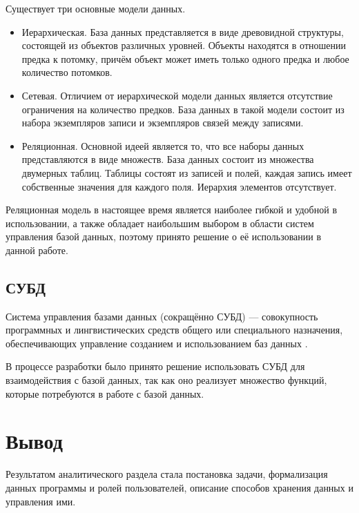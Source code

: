 Существует три основные модели данных.
\begin{itemize}
	\item Иерархическая. База данных представляется в виде древовидной структуры, состоящей из объектов различных уровней. Объекты находятся в отношении предка к потомку, причём объект может иметь только одного предка и любое количество потомков.
	\item Сетевая. Отличием от иерархической модели данных является отсутствие ограничения на количество предков. База данных в такой модели состоит из набора экземпляров записи и экземпляров связей между записями.
	\item Реляционная. Основной идеей является то, что все наборы данных представляются в виде множеств. База данных состоит из множества двумерных таблиц. Таблицы состоят из записей и полей, каждая запись имеет собственные значения для каждого поля. Иерархия элементов отсутствует. 
\end{itemize}

Реляционная модель в настоящее время является наиболее гибкой и удобной в использовании, а также обладает наибольшим выбором в области систем управления базой данных, поэтому принято решение о её использовании в данной работе.


\subsection{СУБД}
Система управления базами данных (сокращённо СУБД) — совокупность
программных и лингвистических средств общего или специального назначения,
обеспечивающих управление созданием и использованием баз данных \cite{db_model}.

В процессе разработки было принято решение использовать СУБД для взаимодействия с базой данных, так как оно реализует множество функций, которые потребуются в работе с базой данных.


\section*{Вывод}
Результатом аналитического раздела стала постановка задачи, формализация данных программы и ролей пользователей, описание способов хранения данных и управления ими.
